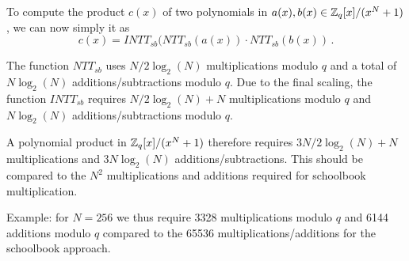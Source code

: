 \begin{algorithm}[!t] \label{algo:intt_sb}
\begin{scriptsize}
\caption{\emph{$INTT_{sb}$}}
\end{scriptsize}
\end{algorithm} 

To compute the product $c(x)$ of two polynomials in $a(x), b(x) \in \mathbb{Z}_q[x]/(x^N+1)$, we can now simply it as 
\[  c(x) = INTT_{sb}(NTT_{sb}(a(x)) \cdot NTT_{sb}(b(x)) \, . \]

The function $NTT_{sb}$ uses $N/2 \log_2(N)$ multiplications modulo $q$ and a total of $N \log_2(N)$ additions/subtractions modulo $q$.
Due to the final scaling, the function $INTT_{sb}$ requires $N/2 \log_2(N) + N$ multiplications modulo $q$ and 
$N \log_2(N)$ additions/subtractions modulo $q$.

A polynomial product in $\mathbb{Z}_q[x]/(x^N+1)$ therefore requires $3N/2 \log_2(N) + N$ multiplications and $3 N \log_2(N)$ 
additions/subtractions.  This should be compared to the $N^2$ multiplications and additions required for schoolbook multiplication.

Example: for $N = 256$ we thus require 3328 multiplications modulo $q$ and 6144 additions modulo $q$ compared to the 
65536 multiplications/additions for the schoolbook approach.

